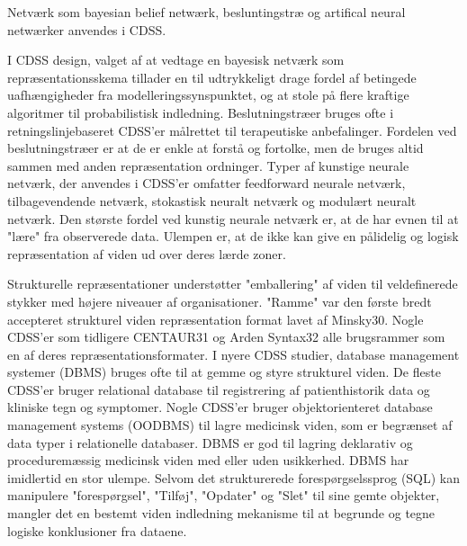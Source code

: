 Netværk som bayesian belief netwærk, besluntingstræ og artifical neural netwærker anvendes i CDSS. 

I CDSS design, valget af at vedtage en bayesisk netværk som repræsentationsskema tillader en til udtrykkeligt drage fordel af betingede uafhængigheder fra modelleringssynspunktet, og at stole på flere kraftige algoritmer til probabilistisk indledning. Beslutningstræer bruges ofte i retningslinjebaseret CDSS'er målrettet til terapeutiske anbefalinger. Fordelen ved beslutningstræer er at de er enkle at forstå og fortolke, men de bruges altid sammen med anden repræsentation ordninger. Typer af kunstige neurale netværk, der anvendes i
CDSS'er omfatter feedforward neurale netværk, tilbagevendende netværk, stokastisk neuralt netværk og modulært neuralt
netværk. Den største fordel ved kunstig neurale netværk er, at de har evnen til at "lære" fra observerede data. Ulempen er, at de ikke kan give en pålidelig og logisk repræsentation af viden ud over deres lærde zoner.
 
Strukturelle repræsentationer understøtter 
"emballering" af viden til veldefinerede stykker med højere niveauer af organisationer. "Ramme" var den første
bredt accepteret strukturel viden repræsentation format lavet af Minsky30. Nogle CDSS'er som tidligere CENTAUR31 og Arden Syntax32 alle brugsrammer som en af deres repræsentationsformater.
I nyere CDSS studier, database management
systemer (DBMS) bruges ofte til at gemme og
styre strukturel viden. De fleste CDSS'er bruger relational database til registrering af patienthistorik data og kliniske tegn og symptomer. Nogle CDSS'er bruger objektorienteret database management systems (OODBMS) til lagre medicinsk viden, som er begrænset af data typer i relationelle databaser. DBMS er god til lagring
deklarativ og proceduremæssig medicinsk viden med eller uden usikkerhed. DBMS har imidlertid en stor ulempe. Selvom det strukturerede forespørgselssprog (SQL) kan manipulere "forespørgsel", "Tilføj", "Opdater" og "Slet" til sine gemte objekter, mangler det en bestemt viden indledning mekanisme til at begrunde og tegne logiske konklusioner fra dataene. \citep{KONG2008}




